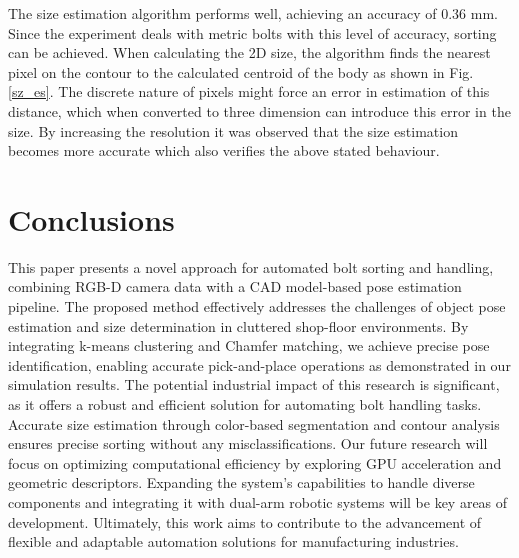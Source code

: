 \documentclass[conference]{IEEEtran}
\begin{document}
The size estimation algorithm performs well, achieving an accuracy of 0.36 mm. Since the experiment deals with metric bolts with this level of accuracy, sorting can be achieved. When calculating the 2D size, the algorithm finds the nearest pixel on the contour to the calculated centroid of the body as shown in Fig. \ref{sz_es}. The discrete nature of pixels might force an error in estimation of this distance, which when converted to three dimension can introduce this error in the size. By increasing the resolution it was observed that the size estimation becomes more accurate which also verifies the above stated behaviour.

\section{Conclusions}
This paper presents a novel approach for automated bolt sorting and handling,
 combining RGB-D camera data with a CAD model-based pose estimation pipeline. The proposed method effectively addresses the challenges of object pose estimation and size determination in cluttered shop-floor environments. By integrating k-means clustering and Chamfer matching, we achieve precise pose identification, enabling accurate pick-and-place operations as demonstrated in our simulation results. The potential industrial impact of this research is significant, as it offers a robust and efficient solution for automating bolt handling tasks. Accurate size estimation through color-based segmentation and contour analysis ensures precise sorting without any misclassifications. Our future research will focus on optimizing computational efficiency by exploring GPU acceleration and geometric descriptors. Expanding the system's capabilities to handle diverse components and integrating it with dual-arm robotic systems will be key areas of development. Ultimately, this work aims to contribute to the advancement of flexible and adaptable automation solutions for manufacturing industries.





\end{document}

